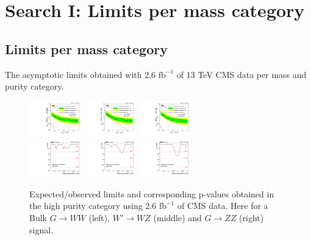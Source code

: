 \chapter{Search I: Limits per mass category}
\vspace*{\fill}\newpage
\section{Limits per mass category}
\label{app:search1}
The asymptotic limits obtained with 2.6 $\textrm{fb}^{-1}$ of 13 TeV CMS data per mass and purity category.

\begin{figure}[h!]
\centering
\includegraphics[width=0.20\textwidth]{figures/analysis/search1/AN-15-211/limits/brazilianFlag_BulkWW_VVHP_new_combined_purity_13TeV_wPDF.pdf}
\includegraphics[width=0.20\textwidth]{figures/analysis/search1/AN-15-211/limits/brazilianFlag_WZ_VVHP_new_combined_purity_13TeV_wPDF.pdf}
\includegraphics[width=0.20\textwidth]{figures/analysis/search1/AN-15-211/limits/brazilianFlag_BulkZZ_VVHP_new_combined_purity_13TeV_wPDF.pdf}\\
\includegraphics[width=0.20\textwidth]{figures/analysis/search1/AN-15-211/pvalues/pvalue_BulkWWinVVnew_high_purity.pdf}
\includegraphics[width=0.20\textwidth]{figures/analysis/search1/AN-15-211/pvalues/pvalue_WZinVVnew_high_purity.pdf}
\includegraphics[width=0.20\textwidth]{figures/analysis/search1/AN-15-211/pvalues/pvalue_BulkZZinVVnew_high_purity.pdf}
\caption{Expected/observed limits and corresponding p-values obtained in the high purity category using 2.6 $\textrm{fb}^{-1}$ of CMS data. Here for a Bulk $G\rightarrow WW$ (left), $W'\rightarrow WZ$ (middle) and $G\rightarrow ZZ$ (right) signal.}
\label{fig:searchI:Limits_HP}
\end{figure}

